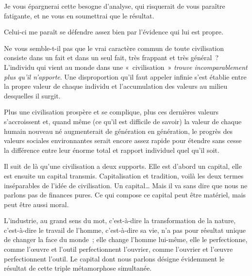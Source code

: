 \documentclass[french,twoside]{book} %
\begin{document}
\noindent Je vous épargnerai cette besogne d’analyse, qui risquerait de vous paraître fatigante, et ne vous en soumettrai que le résultat.\par
Celui-ci me paraît se défendre assez bien par l’évidence qui lui est propre.\par
Ne vous semble-t-il pas que le vrai caractère commun de toute civilisation consiste dans un fait et dans un seul fait, très frappant et très général ? L’individu qui vient au monde dans une « civilisation » \emph{trouve incomparablement plus qu’il n’apporte}. Une disproportion qu’il faut appeler infinie s’est établie entre la propre valeur de chaque individu et l’accumulation des valeurs au milieu desquelles il surgit.\par
Plus une civilisation prospère et se complique, plus ces dernières valeurs s’accroissent et, quand même (ce qu’il est difficile de savoir) la valeur de chaque humain nouveau né augmenterait de génération en génération, le progrès des valeurs sociales environnantes serait encore assez rapide pour étendre sans cesse la différence entre leur énorme total et rapport individuel quel qu’il soit.\par
Il suit de là qu’une civilisation a deux supports. Elle est d’abord un capital, elle est ensuite un capital transmis. Capitalisation et tradition, voilà les deux termes inséparables de l’idée de civilisation. Un capital… Mais il va sans dire que nous ne parlons pas de finances pures. Ce qui compose ce capital peut être matériel, mais peut être aussi moral.\par
L’industrie, au grand sens du mot, c’est-à-dire la transformation de la nature, c’est-à-dire le travail de l’homme, c’est-à-dire sa vie, n’a pas pour résultat unique de changer la face du monde ; elle change l’homme lui-même, elle le perfectionne, comme l’œuvre et l’outil perfectionnent l’ouvrier, comme l’ouvrier et l’œuvre perfectionnent l’outil. Le capital dont nous parlons désigne évidemment le résultat de cette triple métamorphose simultanée.\par
\end{document}
